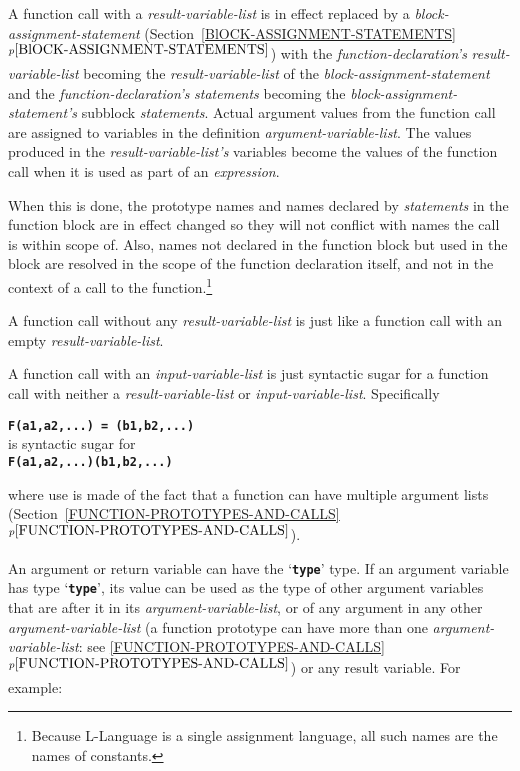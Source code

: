 \documentclass[12pt]{article}
\newcommand{\TT}[1]{{\tt \bfseries #1}}
\newcommand{\itemref}[1]{\ref{#1}$^{p\pageref{#1}}$}
\newcommand{\EOL}{\penalty \exhyphenpenalty}
\begin{document}
A function call with a {\em result-variable-list}
is in effect replaced by a {\em block-assignment-statement}
(Section~\itemref{BlOCK-ASSIGNMENT-STATEMENTS})
with the {\em function-declaration's} {\em result-variable-list} becoming the 
{\em result-variable-list} of the {\em block-assignment-statement} and the
{\em function-declaration's} {\em statements} becoming the 
{\em block-\EOL assign\-ment-\EOL state\-ment's} subblock {\em statements}.
Actual argument values from the function call are assigned to variables in
the definition {\em argument-variable-list}.  The values produced in
the {\em result-variable-list's} variables become the values of the
function call when it is used as part of an {\em expression}.

When this is done, the prototype names and names
declared by {\em statements} in the
function block are in effect changed so they will not conflict
with names the call is within scope of.  Also, names not declared
in the function block but used in the block are resolved
in the scope of the function declaration itself,
and not in the context of a call to the function.\footnote{
Because L-Language is a single assignment language, all such
names are the names of constants.}

A function call without any {\em result-variable-list}
is just like a function call with an empty
{\em result-variable-list}.

A function call with an {\em input-variable-list} is just syntactic
sugar for a function call with neither a {\em result-variable-list}
or {\em input-variable-list}.  Specifically
\begin{center}
\TT{F(a1,a2,...)~=~(b1,b2,...)} \\
is syntactic sugar for \\
\TT{F(a1,a2,...)(b1,b2,...)} \\
\end{center}

where use is made of the fact that a function can have multiple
argument lists (Section~\itemref{FUNCTION-PROTOTYPES-AND-CALLS}).

An argument or return variable can have the `\TT{type}' type.
If an argument variable has type `\TT{type}', its value can be used as the
type of other argument variables that are
after it in its {\em argument-variable-list},
or of any argument in any other {\em argument-variable-list}
(a function prototype can have more than one {\em argument-variable-list}:
see \itemref{FUNCTION-PROTOTYPES-AND-CALLS})
or any
result variable.  For example:
\end{document}
